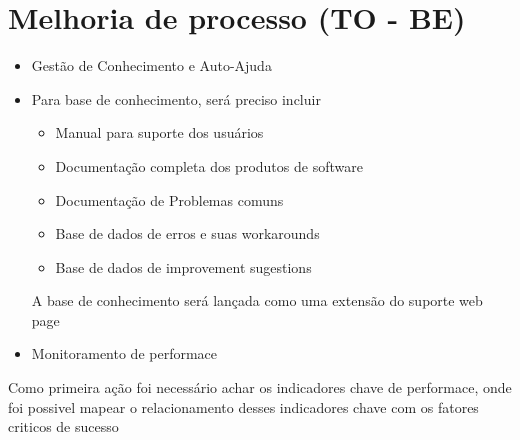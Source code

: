 \documentclass[11pt,a4paper]{article}
\begin{document}
\section{ Melhoria de processo (TO - BE)}

\begin{itemize}[noitemsep]
	\item Gestão de Conhecimento e Auto-Ajuda
	\item	Para base de conhecimento, será preciso incluir
	\begin{itemize}[noitemsep]
		\item Manual para suporte dos usuários
		\item Documentação completa dos produtos de software
		\item Documentação de Problemas comuns
		\item Base de dados de erros e suas workarounds
		\item Base de dados de improvement sugestions
	\end{itemize}
	A base de conhecimento será lançada como uma extensão do
	suporte web page
	\item Monitoramento de performace 
\end{itemize}


Como primeira ação foi necessário achar os indicadores chave de performace,
onde foi possivel mapear o relacionamento desses indicadores chave com os fatores
\cite{cartlidge2007introductory} criticos de sucesso










 
\end{document}
